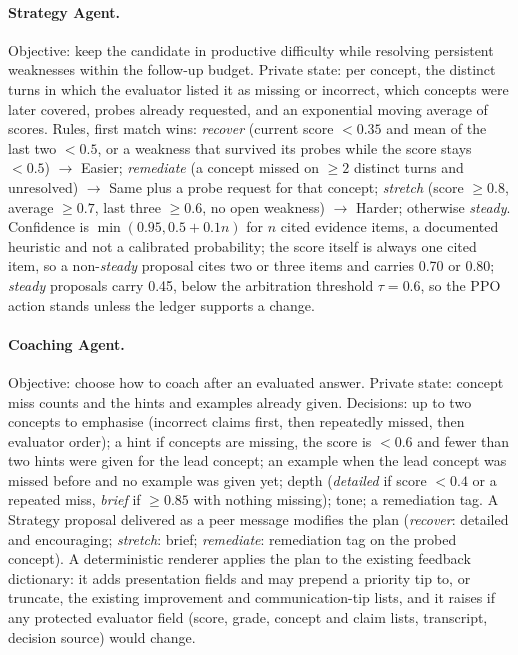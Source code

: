 \paragraph{Strategy Agent.} Objective: keep the candidate in productive difficulty while resolving persistent weaknesses within the follow-up budget. Private state: per concept, the distinct turns in which the evaluator listed it as missing or incorrect, which concepts were later covered, probes already requested, and an exponential moving average of scores. Rules, first match wins: \emph{recover} (current score $<0.35$ and mean of the last two $<0.5$, or a weakness that survived its probes while the score stays $<0.5$) $\rightarrow$ Easier; \emph{remediate} (a concept missed on $\ge 2$ distinct turns and unresolved) $\rightarrow$ Same plus a probe request for that concept; \emph{stretch} (score $\ge0.8$, average $\ge0.7$, last three $\ge0.6$, no open weakness) $\rightarrow$ Harder; otherwise \emph{steady}. Confidence is $\min(0.95, 0.5{+}0.1n)$ for $n$ cited evidence items, a documented heuristic and not a calibrated probability; the score itself is always one cited item, so a non-\emph{steady} proposal cites two or three items and carries 0.70 or 0.80; \emph{steady} proposals carry 0.45, below the arbitration threshold $\tau{=}0.6$, so the PPO action stands unless the ledger supports a change.

\paragraph{Coaching Agent.} Objective: choose how to coach after an evaluated answer. Private state: concept miss counts and the hints and examples already given. Decisions: up to two concepts to emphasise (incorrect claims first, then repeatedly missed, then evaluator order); a hint if concepts are missing, the score is $<0.6$ and fewer than two hints were given for the lead concept; an example when the lead concept was missed before and no example was given yet; depth (\emph{detailed} if score $<0.4$ or a repeated miss, \emph{brief} if $\ge0.85$ with nothing missing); tone; a remediation tag. A Strategy proposal delivered as a peer message modifies the plan (\emph{recover}: detailed and encouraging; \emph{stretch}: brief; \emph{remediate}: remediation tag on the probed concept). A deterministic renderer applies the plan to the existing feedback dictionary: it adds presentation fields and may prepend a priority tip to, or truncate, the existing improvement and communication-tip lists, and it raises if any protected evaluator field (score, grade, concept and claim lists, transcript, decision source) would change.


